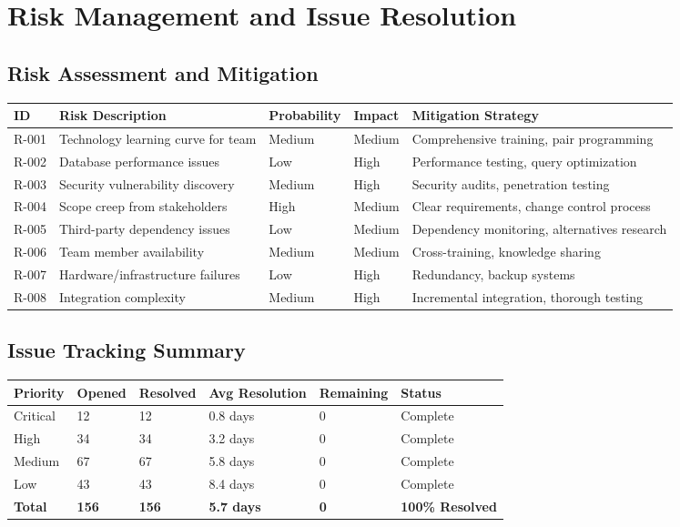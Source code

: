 \documentclass[12pt,a4paper]{article}
\begin{document}
\section{Risk Management and Issue Resolution}

\subsection{Risk Assessment and Mitigation}

\begin{longtable}{|p{0.5cm}|p{4cm}|p{1.5cm}|p{3cm}|p{3cm}|}
\hline
\textbf{ID} & \textbf{Risk Description} & \textbf{Probability} & \textbf{Impact} & \textbf{Mitigation Strategy} \\
\hline
R-001 & Technology learning curve for team & Medium & Medium & Comprehensive training, pair programming \\
\hline
R-002 & Database performance issues & Low & High & Performance testing, query optimization \\
\hline
R-003 & Security vulnerability discovery & Medium & High & Security audits, penetration testing \\
\hline
R-004 & Scope creep from stakeholders & High & Medium & Clear requirements, change control process \\
\hline
R-005 & Third-party dependency issues & Low & Medium & Dependency monitoring, alternatives research \\
\hline
R-006 & Team member availability & Medium & Medium & Cross-training, knowledge sharing \\
\hline
R-007 & Hardware/infrastructure failures & Low & High & Redundancy, backup systems \\
\hline
R-008 & Integration complexity & Medium & High & Incremental integration, thorough testing \\
\hline
\end{longtable}

\subsection{Issue Tracking Summary}

\begin{longtable}{|p{2cm}|p{2cm}|p{2cm}|p{2cm}|p{2cm}|p{2cm}|}
\hline
\textbf{Priority} & \textbf{Opened} & \textbf{Resolved} & \textbf{Avg Resolution} & \textbf{Remaining} & \textbf{Status} \\
\hline
Critical & 12 & 12 & 0.8 days & 0 & \cellcolor{completedgreen}Complete \\
\hline
High & 34 & 34 & 3.2 days & 0 & \cellcolor{completedgreen}Complete \\
\hline
Medium & 67 & 67 & 5.8 days & 0 & \cellcolor{completedgreen}Complete \\
\hline
Low & 43 & 43 & 8.4 days & 0 & \cellcolor{completedgreen}Complete \\
\hline
\textbf{Total} & \textbf{156} & \textbf{156} & \textbf{5.7 days} & \textbf{0} & \textbf{\cellcolor{completedgreen}100\% Resolved} \\
\hline
\end{longtable}
\end{document}
